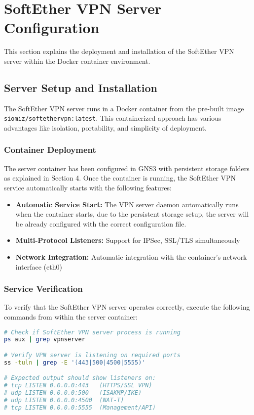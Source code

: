 \newpage

\section{SoftEther VPN Server Configuration}

This section explains the deployment and installation of the SoftEther VPN server within the Docker container environment. 

\subsection{Server Setup and Installation}

The SoftEther VPN server runs in a Docker container from the pre-built image \texttt{siomiz/softethervpn:latest}. This containerized approach has various advantages like isolation, portability, and simplicity of deployment.

\subsubsection{Container Deployment}

The server container has been configured in GNS3 with persistent storage folders as explained in Section 4. Once the container is running, the SoftEther VPN service automatically starts with the following features:

\begin{itemize}
    \item \textbf{Automatic Service Start:} The VPN server daemon automatically runs when the container starts, due to the persistent storage setup, the server will be already configured with the correct configuration file.
    \item \textbf{Multi-Protocol Listeners:} Support for IPSec, SSL/TLS simultaneously
    \item \textbf{Network Integration:} Automatic integration with the container's network interface (eth0)
\end{itemize}

\subsubsection{Service Verification}

To verify that the SoftEther VPN server operates correctly, execute the following commands from within the server container:

\begin{lstlisting}[language=bash]
# Check if SoftEther VPN server process is running
ps aux | grep vpnserver

# Verify VPN server is listening on required ports
ss -tuln | grep -E '(443|500|4500|5555)'

# Expected output should show listeners on:
# tcp LISTEN 0.0.0.0:443   (HTTPS/SSL VPN)
# udp LISTEN 0.0.0.0:500   (ISAKMP/IKE)
# udp LISTEN 0.0.0.0:4500  (NAT-T)
# tcp LISTEN 0.0.0.0:5555  (Management/API)
\end{lstlisting}

